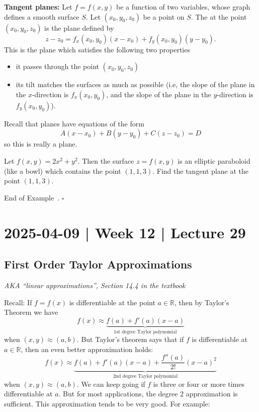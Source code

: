 \documentclass[10pt]{article}
\theoremstyle{definition}
\newtheorem{example}[theorem]{Example}
\renewenvironment{example}
{\begin{oldexample}}
  {\par\smallskip\hfill   End of Example~\theexample. $\square$    \par\end{oldexample}}
\newcommand{\vt}{\vskip 5mm} %
\newcommand{\Fl}{\vt\noindent\textbf} %
\newcommand{\1}[1]{\textbf{1}_{\left[#1\right]}} %
\def\R{\mathbb{R}} %
\newcommand{\dempfcolor}[1]{{\color{RoyalBlue}#1}}
\newcommand{\demph}[1]{\dempfcolor{{\sl #1}}}
\begin{document}
\Fl{Tangent planes:} Let $f=f(x,y)$ be a function of two variables, whose
graph defines a smooth surface $S$. Let $(x_{0},y_{0},z_{0})$ be a point on
$S$. The \demph{tangent plane} at the point $(x_{0},y_{0},z_{0})$ is the plane
defined by
\begin{equation*}
  z-z_{0} = f_{x}(x_{0},y_{0})(x-x_{0})+f_{y}(x_{0},y_{0})(y-y_{0}).
\end{equation*}
This is the plane which satisfies the following two properties
\begin{itemize}
  \item it passes through the point $(x_{0},y_{0},z_{0})$
  \item its tilt matches the surfaces as much as possible (i.e, the slope of
  the plane in the $x$-direction is $f_{x}(x_{0},y_{0})$, and the slope of the
  plane in the $y$-direction is $f_{y}(x_{0},y_{0})$).
\end{itemize}
Recall that planes have equations of the form
\begin{equation*}
  A(x-x_{0})+B(y-y_{0})+C(z-z_{0})=D
\end{equation*}
so this is really a plane. 

\begin{example}
  Let $f(x,y) = 2x^{2}+y^{2}$. Then the surface $z=f(x,y)$ is an elliptic
  paraboloid (like a bowl) which contains the point $(1,1,3)$. Find the
  tangent plane at the point $(1,1,3)$.
\end{example}

\newpage
\section{2025-04-09 | Week 12 | Lecture 29}

\subsection{First Order Taylor Approximations}
\textit{AKA ``linear approximations'', Section 14.4 in the textbook}


Recall: If $f=f(x)$ is differentiable at the point $a\in \R$, then by
Taylor's Theorem we have
\begin{equation*}
  f(x) \approx
  \underbrace{f(a)+f'(a)(x-a)}_{\text{1st degree
      Taylor polynomial}}
\end{equation*}
when $(x,y) \approx (a,b)$. But Taylor's theorem says that if $f$ is
\demph{twice} differentiable at $a\in \R$, then an even better approximation holds:
\begin{equation*}
  f(x) \approx
  \underbrace{f(a)+f'(a)(x-a)+\frac{f''(a)}{2!}(x-a)^{2}}_{\text{2nd degree
      Taylor polynomial}}
\end{equation*}
when $(x,y) \approx (a,b)$. We can keep going if $f$ is three or four or more
times differentiable at $a$. But for most applications, the degree 2
approximation is sufficient. This approximation tends to be very good. For
example:
\end{document}
